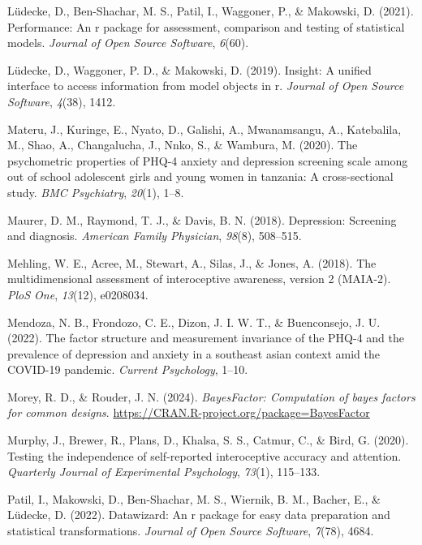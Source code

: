 \documentclass[
  jou,
  floatsintext,
  longtable,
  nolmodern,
  notxfonts,
  notimes,
  colorlinks=true,linkcolor=blue,citecolor=blue,urlcolor=blue]{apa7}
\newlength{\cslhangindent}
\newenvironment{CSLReferences}[2] %
 {\begin{list}{}{%
  \setlength{\itemindent}{0pt}
  \setlength{\leftmargin}{0pt}
  \setlength{\parsep}{0pt}
  \ifodd #1
   \setlength{\leftmargin}{\cslhangindent}
   \setlength{\itemindent}{-1\cslhangindent}
  \fi
  \setlength{\itemsep}{#2\baselineskip}}}
 {\end{list}}
\begin{document}
\begin{CSLReferences}{1}{0}
Lüdecke, D., Ben-Shachar, M. S., Patil, I., Waggoner, P., \& Makowski,
D. (2021). Performance: An r package for assessment, comparison and
testing of statistical models. \emph{Journal of Open Source Software},
\emph{6}(60).

Lüdecke, D., Waggoner, P. D., \& Makowski, D. (2019). Insight: A unified
interface to access information from model objects in r. \emph{Journal
of Open Source Software}, \emph{4}(38), 1412.

Materu, J., Kuringe, E., Nyato, D., Galishi, A., Mwanamsangu, A.,
Katebalila, M., Shao, A., Changalucha, J., Nnko, S., \& Wambura, M.
(2020). The psychometric properties of PHQ-4 anxiety and depression
screening scale among out of school adolescent girls and young women in
tanzania: A cross-sectional study. \emph{BMC Psychiatry}, \emph{20}(1),
1--8.

Maurer, D. M., Raymond, T. J., \& Davis, B. N. (2018). Depression:
Screening and diagnosis. \emph{American Family Physician}, \emph{98}(8),
508--515.

Mehling, W. E., Acree, M., Stewart, A., Silas, J., \& Jones, A. (2018).
The multidimensional assessment of interoceptive awareness, version 2
(MAIA-2). \emph{PloS One}, \emph{13}(12), e0208034.

Mendoza, N. B., Frondozo, C. E., Dizon, J. I. W. T., \& Buenconsejo, J.
U. (2022). The factor structure and measurement invariance of the PHQ-4
and the prevalence of depression and anxiety in a southeast asian
context amid the COVID-19 pandemic. \emph{Current Psychology}, 1--10.

Morey, R. D., \& Rouder, J. N. (2024). \emph{BayesFactor: Computation of
bayes factors for common designs}.
\url{https://CRAN.R-project.org/package=BayesFactor}

Murphy, J., Brewer, R., Plans, D., Khalsa, S. S., Catmur, C., \& Bird,
G. (2020). Testing the independence of self-reported interoceptive
accuracy and attention. \emph{Quarterly Journal of Experimental
Psychology}, \emph{73}(1), 115--133.

Patil, I., Makowski, D., Ben-Shachar, M. S., Wiernik, B. M., Bacher, E.,
\& Lüdecke, D. (2022). Datawizard: An r package for easy data
preparation and statistical transformations. \emph{Journal of Open
Source Software}, \emph{7}(78), 4684.


\end{CSLReferences}
\end{document}
